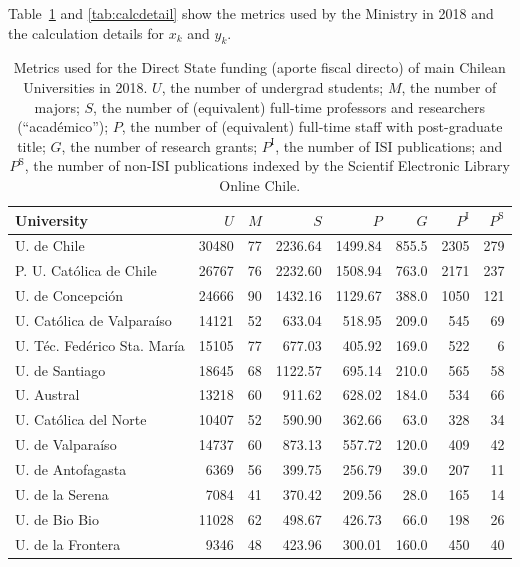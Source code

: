 \documentclass[twocolumn]{article}
\def\npup{\ensuremath{U}}
\def\nmaj{\ensuremath{M}}
\def\nprof{\ensuremath{S}}
\def\ngrad{\ensuremath{P}}
\def\ngrant{\ensuremath{G}}
\def\nisi{\ensuremath{P^\text{I}}}
\def\nscielo{\ensuremath{P^\text{S}}}
\begin{document}
Table~\ref{tab:metrics} and \ref{tab:calcdetail} show the metrics used by the
Ministry in 2018 and the calculation details for $x_k$ and $y_k$. 

\begin{table}[t]
\caption{Metrics used for the Direct State funding (aporte fiscal directo) of
main Chilean Universities in 2018. \npup{}, the number of
undergrad students; \nmaj{}, the number of majors; \nprof{}, the number of
(equivalent) full-time professors and researchers (``académico''); \ngrad{},
the number of (equivalent) full-time staff with post-graduate title; \ngrant{},
the number of research grants; $\nisi$, the number of ISI publications; and
$\nscielo$, the number of non-ISI publications indexed by the Scientif
Electronic Library Online Chile.}
\label{tab:metrics}
\centering\footnotesize
\begin{tabular}{l rrrrrrr}
\hline
University                 & \npup  & \nmaj &\nprof  &\ngrad &\ngrant& \nisi&\nscielo\\
\hline\hline
U. de Chile               & 30480 	& 77 &   2236.64&1499.84&855.5  &  2305&	279  \\
P. U. Católica de Chile    & 26767 	& 76 &   2232.60&1508.94&763.0  &  2171&	237  \\
U. de Concepción           & 24666 	& 90 &   1432.16&1129.67&388.0  &  1050&	121  \\
U. Católica de Valparaíso  & 14121 	& 52 &    633.04& 518.95&209.0  &   545&	 69  \\
U. Téc. Fedérico Sta. María& 15105 	& 77 &    677.03& 405.92&169.0  &   522&	  6  \\
U. de Santiago             & 18645 	& 68 &   1122.57& 695.14&210.0  &   565&	 58  \\
U. Austral                 & 13218 	& 60 &    911.62& 628.02&184.0  &   534&	 66  \\
U. Católica del Norte      & 10407 	& 52 &    590.90& 362.66& 63.0  &   328&	 34  \\
U. de Valparaíso           & 14737 	& 60 &    873.13& 557.72&120.0  &   409&	 42  \\
U. de Antofagasta          &  6369 	& 56 &    399.75& 256.79& 39.0  &   207&	 11  \\
U. de la Serena            &  7084 	& 41 &    370.42& 209.56& 28.0  &   165&	 14  \\
U. de Bio Bio              & 11028 	& 62 &    498.67& 426.73& 66.0  &   198&	 26  \\
U. de la Frontera          &  9346 	& 48 &    423.96& 300.01&160.0  &   450&	 40  \\

\end{tabular}
\end{table}
\end{document}
